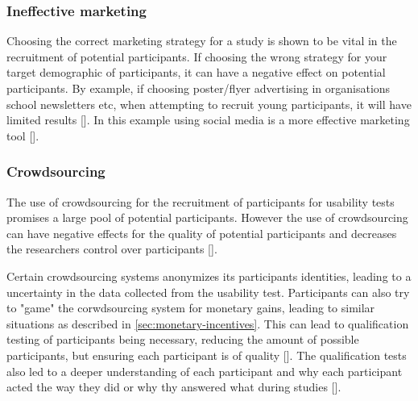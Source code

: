 \subsubsection{Ineffective marketing}
Choosing the correct marketing strategy for a study is shown to be vital in the recruitment of potential participants. If choosing the wrong strategy for your target demographic of participants, it can have a negative effect on potential participants. By example, if choosing poster/flyer advertising in organisations school newsletters etc, when attempting to recruit young participants, it will have limited results [\cite{aj_2015}]. In this example using social media is a more effective marketing tool [\cite{aj_2015}].

\subsubsection{Crowdsourcing} \label{sec:crowdsourcing}
The use of crowdsourcing for the recruitment of participants for usability tests promises a large pool of potential participants. However the use of crowdsourcing can have negative effects for the quality of potential participants and decreases the researchers control over participants [\cite{kts_2010}].

Certain crowdsourcing systems anonymizes its participants identities, leading to a uncertainty in the data collected from the usability test. Participants can also try to "game" the corwdsourcing system for monetary gains, leading to similar situations as described in \autoref{sec:monetary-incentives}. This can lead to qualification testing of participants being necessary, reducing the amount of possible participants, but ensuring each participant is of quality [\cite{kts_2010}]. The qualification tests also led to a deeper understanding of each participant and why each participant acted the way they did or why thy answered what during studies [\cite{kts_2010}].